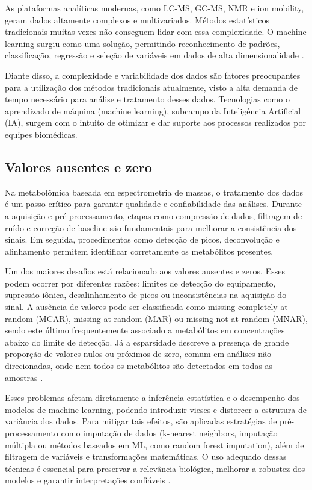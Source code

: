 As plataformas analíticas modernas, como LC-MS, GC-MS, NMR e ion mobility, geram dados altamente complexos e multivariados. Métodos estatísticos tradicionais muitas vezes não conseguem lidar com essa complexidade. O machine learning surgiu como uma solução, permitindo reconhecimento de padrões, classificação, regressão e seleção de variáveis em dados de alta dimensionalidade \cite{picone2026integrating}. 

Diante disso, a complexidade e variabilidade dos dados são fatores preocupantes para a utilização dos métodos tradicionais atualmente, visto a alta demanda de tempo necessário para análise e tratamento desses dados. Tecnologias como o aprendizado de máquina (machine learning), subcampo da Inteligência Artificial (IA), surgem com o intuito de otimizar e dar suporte aos processos realizados por equipes biomédicas.


\subsection{Valores ausentes e zero}

 Na metabolômica baseada em espectrometria de massas, o tratamento dos dados é um passo crítico para garantir qualidade e confiabilidade das análises. Durante a aquisição e pré-processamento, etapas como compressão de dados, filtragem de ruído e correção de baseline são fundamentais para melhorar a consistência dos sinais. Em seguida, procedimentos como detecção de picos, deconvolução e alinhamento permitem identificar corretamente os metabólitos presentes.

Um dos maiores desafios está relacionado aos valores ausentes e zeros. Esses podem ocorrer por diferentes razões: limites de detecção do equipamento, supressão iônica, desalinhamento de picos ou inconsistências na aquisição do sinal. A ausência de valores pode ser classificada como missing completely at random (MCAR), missing at random (MAR) ou missing not at random (MNAR), sendo este último frequentemente associado a metabólitos em concentrações abaixo do limite de detecção. Já a esparsidade descreve a presença de grande proporção de valores nulos ou próximos de zero, comum em análises não direcionadas, onde nem todos os metabólitos são detectados em todas as amostras \cite{metabolomicsdatatreatment}.

Esses problemas afetam diretamente a inferência estatística e o desempenho dos modelos de machine learning, podendo introduzir vieses e distorcer a estrutura de variância dos dados. Para mitigar tais efeitos, são aplicadas estratégias de pré-processamento como imputação de dados (k-nearest neighbors, imputação múltipla ou métodos baseados em ML, como random forest imputation), além de filtragem de variáveis e transformações matemáticas. O uso adequado dessas técnicas é essencial para preservar a relevância biológica, melhorar a robustez dos modelos e garantir interpretações confiáveis \cite{metabolomicsdatatreatment}.



